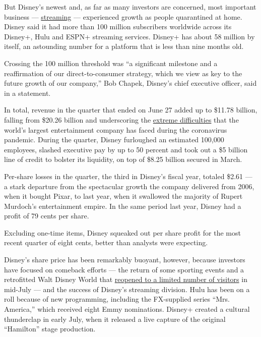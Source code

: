 But Disney's newest and, as far as many investors are concerned, most
important business ---
\href{https://www.nytimes.com/2020/04/08/business/disney-plus-50-million-subscribers.html}{streaming}
--- experienced growth as people quarantined at home. Disney said it had
more than 100 million subscribers worldwide across its Disney+, Hulu and
ESPN+ streaming services. Disney+ has about 58 million by itself, an
astounding number for a platform that is less than nine months old.

Crossing the 100 million threshold was ``a significant milestone and a
reaffirmation of our direct-to-consumer strategy, which we view as key
to the future growth of our company,'' Bob Chapek, Disney's chief
executive officer, said in a statement.

In total, revenue in the quarter that ended on June 27 added up to
\$11.78 billion, falling from \$20.26 billion and underscoring the
\href{https://www.nytimes.com/2020/05/04/business/media/coronavirus-disney.html}{extreme
difficulties} that the world's largest entertainment company has faced
during the coronavirus pandemic. During the quarter, Disney furloughed
an estimated 100,000 employees, slashed executive pay by up to 50
percent and took out a \$5 billion line of credit to bolster its
liquidity, on top of \$8.25 billion secured in March.

Per-share losses in the quarter, the third in Disney's fiscal year,
totaled \$2.61 --- a stark departure from the spectacular growth the
company delivered from 2006, when it bought Pixar, to last year, when it
swallowed the majority of Rupert Murdoch's entertainment empire. In the
same period last year, Disney had a profit of 79 cents per share.

Excluding one-time items, Disney squeaked out per share profit for the
most recent quarter of eight cents, better than analysts were expecting.

Disney's share price has been remarkably buoyant, however, because
investors have focused on comeback efforts --- the return of some
sporting events and a retrofitted Walt Disney World that
\href{https://www.nytimes.com/2020/07/11/business/florida-coronavirus-disney-world-reopening.html}{reopened
to a limited number of visitors} in mid-July --- and the success of
Disney's streaming division. Hulu has been on a roll because of new
programming, including the FX-supplied series ``Mrs. America,'' which
received eight Emmy nominations. Disney+ created a cultural thunderclap
in early July, when it released a live capture of the original
``Hamilton'' stage production.

